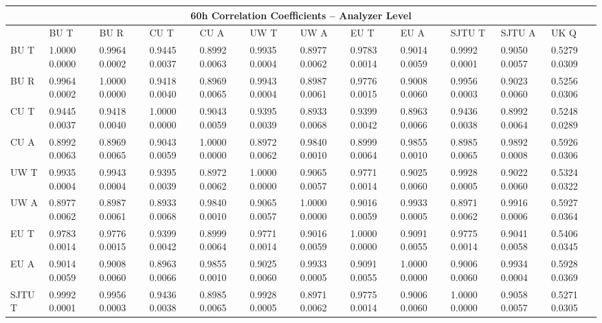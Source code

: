 \begin{landscape}
\begin{table}
\small
\centering
\renewcommand{\arraystretch}{1.5}
\begin{tabularx}{1\linewidth}{@{\extracolsep{\fill}}lXXXXXXXXXXX}
  \toprule
  	\multicolumn{12}{c}{{\normalsize 60h Correlation Coefficients -- Analyzer Level}} \\
  \midrule
  	       & BU T & BU R & CU T & CU A & UW T & UW A & EU T & EU A & SJTU T & SJTU A & UK Q \\
  \midrule
	BU T   & 1.0000 0.0000 & 0.9964 0.0002 & 0.9445 0.0037 & 0.8992 0.0063 & 0.9935 0.0004 & 0.8977 0.0062 & 0.9783 0.0014 & 0.9014 0.0059 & 0.9992 0.0001 & 0.9050 0.0057 & 0.5279 0.0309  \\
	BU R   & 0.9964 0.0002 & 1.0000 0.0000 & 0.9418 0.0040 & 0.8969 0.0065 & 0.9943 0.0004 & 0.8987 0.0061 & 0.9776 0.0015 & 0.9008 0.0060 & 0.9956 0.0003 & 0.9023 0.0060 & 0.5256 0.0306  \\
	CU T   & 0.9445 0.0037 & 0.9418 0.0040 & 1.0000 0.0000 & 0.9043 0.0059 & 0.9395 0.0039 & 0.8933 0.0068 & 0.9399 0.0042 & 0.8963 0.0066 & 0.9436 0.0038 & 0.8992 0.0064 & 0.5248 0.0289  \\
	CU A   & 0.8992 0.0063 & 0.8969 0.0065 & 0.9043 0.0059 & 1.0000 0.0000 & 0.8972 0.0062 & 0.9840 0.0010 & 0.8999 0.0064 & 0.9855 0.0010 & 0.8985 0.0065 & 0.9892 0.0008 & 0.5926 0.0306  \\
	UW T   & 0.9935 0.0004 & 0.9943 0.0004 & 0.9395 0.0039 & 0.8972 0.0062 & 1.0000 0.0000 & 0.9065 0.0057 & 0.9771 0.0014 & 0.9025 0.0060 & 0.9928 0.0005 & 0.9022 0.0060 & 0.5324 0.0322  \\
	UW A   & 0.8977 0.0062 & 0.8987 0.0061 & 0.8933 0.0068 & 0.9840 0.0010 & 0.9065 0.0057 & 1.0000 0.0000 & 0.9016 0.0059 & 0.9933 0.0005 & 0.8971 0.0062 & 0.9916 0.0006 & 0.5927 0.0364  \\
	EU T   & 0.9783 0.0014 & 0.9776 0.0015 & 0.9399 0.0042 & 0.8999 0.0064 & 0.9771 0.0014 & 0.9016 0.0059 & 1.0000 0.0000 & 0.9091 0.0055 & 0.9775 0.0014 & 0.9041 0.0058 & 0.5406 0.0345  \\
	EU A   & 0.9014 0.0059 & 0.9008 0.0060 & 0.8963 0.0066 & 0.9855 0.0010 & 0.9025 0.0060 & 0.9933 0.0005 & 0.9091 0.0055 & 1.0000 0.0000 & 0.9006 0.0060 & 0.9934 0.0004 & 0.5928 0.0369  \\
	SJTU T & 0.9992 0.0001 & 0.9956 0.0003 & 0.9436 0.0038 & 0.8985 0.0065 & 0.9928 0.0005 & 0.8971 0.0062 & 0.9775 0.0014 & 0.9006 0.0060 & 1.0000 0.0000 & 0.9058 0.0057 & 0.5271 0.0305  \\

\end{tabularx}
\end{table}
\end{landscape}
